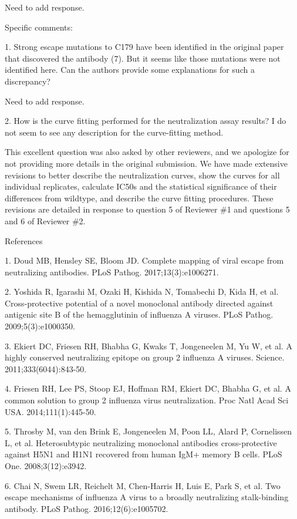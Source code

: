 \documentclass[11pt, oneside]{article}   	%
\begin{document}
{\color{red}
Need to add response.}

Specific comments:

1.  Strong escape mutations to C179 have been identified in the original paper that discovered the antibody (7). But it seems like those mutations were not identified here. Can the authors provide some explanations for such a discrepancy?

{\color{red}
Need to add response.}

2.  How is the curve fitting performed for the neutralization assay results? I do not seem to see any description for the curve-fitting method. 

{
\color{black}
This excellent question was also asked by other reviewers, and we apologize for not providing more details in the original submission.
We have made extensive revisions to better describe the neutralization curves, show the curves for all individual replicates, calculate IC50s and the statistical significance of their differences from wildtype, and describe the curve fitting procedures.
These revisions are detailed in response to question 5 of Reviewer \#1 and questions 5 and 6 of Reviewer \#2.}

References

1.  Doud MB, Hensley SE, Bloom JD. Complete mapping of viral escape from neutralizing antibodies. PLoS Pathog. 2017;13(3):e1006271.

2.  Yoshida R, Igarashi M, Ozaki H, Kishida N, Tomabechi D, Kida H, et al. Cross-protective potential of a novel monoclonal antibody directed against antigenic site B of the hemagglutinin of influenza A viruses. PLoS Pathog. 2009;5(3):e1000350.

3.  Ekiert DC, Friesen RH, Bhabha G, Kwaks T, Jongeneelen M, Yu W, et al. A highly conserved neutralizing epitope on group 2 influenza A viruses. Science. 2011;333(6044):843-50.

4.  Friesen RH, Lee PS, Stoop EJ, Hoffman RM, Ekiert DC, Bhabha G, et al. A common solution to group 2 influenza virus neutralization. Proc Natl Acad Sci USA. 2014;111(1):445-50.

5.  Throsby M, van den Brink E, Jongeneelen M, Poon LL, Alard P, Cornelissen L, et al. Heterosubtypic neutralizing monoclonal antibodies cross-protective against H5N1 and H1N1 recovered from human IgM+ memory B cells. PLoS One. 2008;3(12):e3942.

6.  Chai N, Swem LR, Reichelt M, Chen-Harris H, Luis E, Park S, et al. Two escape mechanisms of influenza A virus to a broadly neutralizing stalk-binding antibody. PLoS Pathog. 2016;12(6):e1005702.
\end{document}
